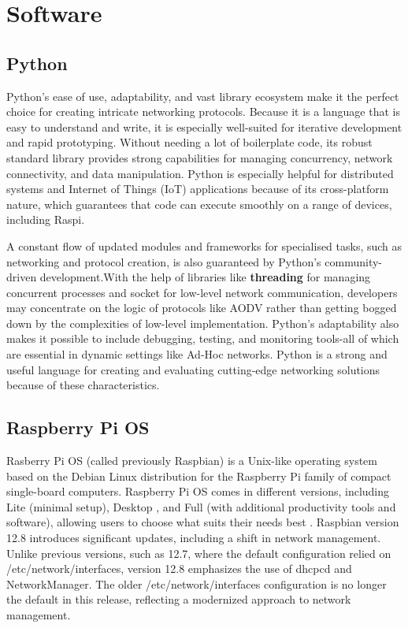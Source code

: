 \documentclass[]{nsm-thesis}
\begin{document}
\section{Software}
\subsection{Python}
Python's ease of use, adaptability, and vast library ecosystem make it the perfect choice for creating intricate networking protocols. Because it is a language that is easy to understand and write, it is especially well-suited for iterative development and rapid prototyping. Without needing a lot of boilerplate code, its robust standard library provides strong capabilities for managing concurrency, network connectivity, and data manipulation. Python is especially helpful for distributed systems and Internet of Things (IoT) applications because of its cross-platform nature, which guarantees that code can execute smoothly on a range of devices, including Raspi.

A constant flow of updated modules and frameworks for specialised tasks, such as networking and protocol creation, is also guaranteed by Python's community-driven development.With the help of libraries like \textbf{threading} \cite{Python} for managing concurrent processes and socket \cite{Python} for low-level network communication, developers may concentrate on the logic of protocols like AODV rather than getting bogged down by the complexities of low-level implementation. Python's adaptability also makes it possible to include debugging, testing, and monitoring tools-all of which are essential in dynamic settings like Ad-Hoc networks. Python is a strong and useful language for creating and evaluating cutting-edge networking solutions because of these characteristics.
\subsection{Raspberry Pi OS}
Rasberry Pi OS (called previously Raspbian) is a Unix-like operating system based on the Debian Linux distribution for the Raspberry Pi family of compact single-board computers.
Raspberry Pi OS comes in different versions, including Lite (minimal setup), Desktop , and Full (with additional productivity tools and software), allowing users to choose what suits their needs best \cite{Raspbian}. Raspbian version 12.8 introduces significant updates, including a shift in network management. Unlike previous versions, such as 12.7, where the default configuration relied on /etc/network/interfaces, version 12.8 emphasizes the use of dhcpcd and NetworkManager. The older /etc/network/interfaces configuration is no longer the default in this release, reflecting a modernized approach to network management.\cite{raspberrypi_interfaces_missing}
\end{document}
